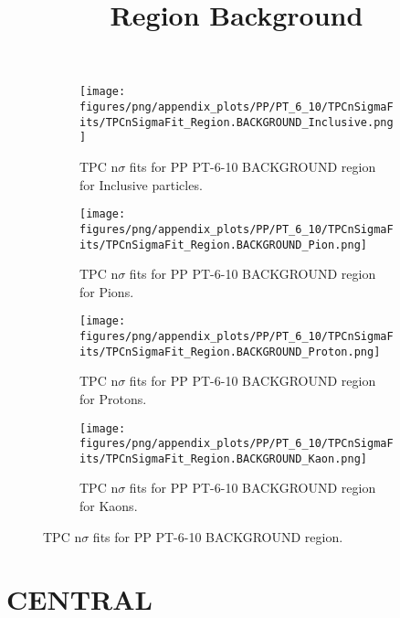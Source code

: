             \begin{figure}[H]
                \title{Region Background}
                \begin{subfigure}[b]{0.5\textwidth}
                    \centering
                    \texttt{[image: figures/png/appendix\_plots/PP/PT\_6\_10/TPCnSigmaFits/TPCnSigmaFit\_Region.BACKGROUND\_Inclusive.png]}
                    \caption{TPC n$\sigma$ fits for PP PT-6-10 BACKGROUND region for Inclusive particles.}
                    \label{fig:appendix_PP_PT-6-10_BACKGROUND_Inclusive}
                \end{subfigure}
                \begin{subfigure}[b]{0.5\textwidth}
                    \centering
                    \texttt{[image: figures/png/appendix\_plots/PP/PT\_6\_10/TPCnSigmaFits/TPCnSigmaFit\_Region.BACKGROUND\_Pion.png]}
                    \caption{TPC n$\sigma$ fits for PP PT-6-10 BACKGROUND region for Pions.}
                    \label{fig:appendix_PP_PT-6-10_BACKGROUND_Pion}
                \end{subfigure}
                \begin{subfigure}[b]{0.5\textwidth}
                    \centering
                    \texttt{[image: figures/png/appendix\_plots/PP/PT\_6\_10/TPCnSigmaFits/TPCnSigmaFit\_Region.BACKGROUND\_Proton.png]}
                    \caption{TPC n$\sigma$ fits for PP PT-6-10 BACKGROUND region for Protons.}
                    \label{fig:appendix_PP_PT-6-10_BACKGROUND_Proton}
                \end{subfigure}
                \begin{subfigure}[b]{0.5\textwidth}
                    \centering
                    \texttt{[image: figures/png/appendix\_plots/PP/PT\_6\_10/TPCnSigmaFits/TPCnSigmaFit\_Region.BACKGROUND\_Kaon.png]}
                    \caption{TPC n$\sigma$ fits for PP PT-6-10 BACKGROUND region for Kaons.}
                    \label{fig:appendix_PP_PT-6-10_BACKGROUND_Kaon}
                \end{subfigure}
                \caption{TPC n$\sigma$ fits for PP PT-6-10 BACKGROUND region.}
                \label{fig:appendix_PP_PT-6-10_BACKGROUND}
            \end{figure}
            \clearpage
            
    
        \section{CENTRAL}
        
